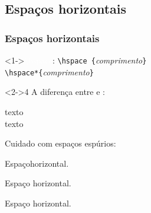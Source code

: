 \documentclass[handout,10pt]{beamer}
\begin{document}
\subsection{Espaços horizontais}
\begin{frame}[fragile]
	\frametitle{Espaços horizontais}
	
	\begin{block}<1->{\textcolor{white}{\textbackslash hspace}: }
		\centering
		\verb|\hspace {|\textit{comprimento}\verb|}|\\
		\verb|\hspace*{|\textit{comprimento}\verb|}|
	\end{block}
	
	
	\begin{atividade}<2->{4}
		A diferença entre  e :
		\begin{LaTeXcode}		
			\noindent\hspace{2cm}texto\\
			         \hspace{2cm}texto   %
		\end{LaTeXcode}

		\medskip

		Cuidado com espaços espúrios:
		\begin{LaTeXcode}
			Espaço\hspace{1cm}horizontal.\par			
			Espaço \hspace{1cm}horizontal.\par			
			Espaço \hspace{1cm} horizontal.
		\end{LaTeXcode}
	\end{atividade}
		
\end{frame}
\end{document}

